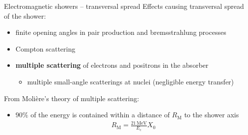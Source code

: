 \documentclass[11pt,xcolor=dvipsnames,professionalfonts,notes]{beamer}
\begin{document}
\begin{frame}{Electromagnetic showers -- transversal spread}
	Effects causing transversal spread of the shower:
	\begin{itemize}
		\setlength\itemsep{1.em}
		\item finite opening angles in pair production and bremsstrahlung processes
		
		\item Compton scattering
		
		\item \textbf{multiple scattering}{\tiny } of electrons and positrons in the absorber
		\begin{itemize}
			\item multiple small-angle scatterings at nuclei (negligible energy transfer)
		\end{itemize}		
	\end{itemize}
	\vfill
	From Molière's theory of multiple scattering:
	\begin{itemize}
		\item $90\%$ of the energy is contained within a distance of $R_\mathrm{M}$ to the shower axis
				\begin{align*}
				R_\mathrm{M} = \frac{21\,\mathrm{MeV}}{E_\mathrm{c}} X_0
				\end{align*}
	\end{itemize}
\end{frame}

\end{document}
